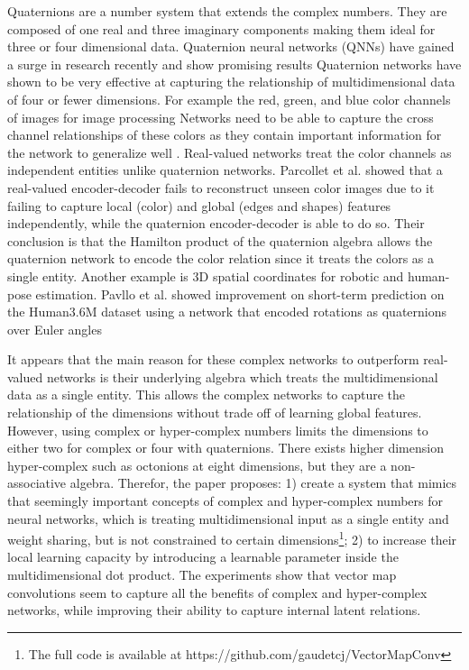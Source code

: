 \documentclass[14pt,a4paper]{article}
\begin{document}
Quaternions are a number system that extends the complex numbers.
They are composed of one real and three imaginary components making them ideal for three or four dimensional data.
Quaternion neural networks (QNNs) have gained a surge in research recently and show promising results \cite{takahashi2017remarks, bayro2018geometric, Gaudet2018, parcollet2017deep, parcollet2017quaternion, parcollet2018quaternion-A, parcollet2018quaternion-B, parcollet2019quaternion}
Quaternion networks have shown to be very effective at capturing the relationship of multidimensional data of four or fewer dimensions.
For example the red, green, and blue color channels of images for image processing
Networks need to be able to capture the cross channel relationships of these colors as they contain important information for the network to generalize well \cite{kusamichi2004new, isokawa2003quaternion}.
Real-valued networks treat the color channels as independent entities unlike quaternion networks.
Parcollet et al. \cite{parcollet2019quaternion} showed that a real-valued encoder-decoder fails to reconstruct unseen color images due to it failing to capture local (color) and global (edges and shapes) features independently, while the quaternion encoder-decoder is able to do so.
Their conclusion is that the Hamilton product of the quaternion algebra allows the quaternion network to encode the color relation since it treats the colors as a single entity.
Another example is 3D spatial coordinates for robotic and human-pose estimation.
Pavllo et al. \cite{pavllo2018quaternet} showed improvement on short-term prediction on the Human3.6M dataset using a network that encoded rotations as quaternions over Euler angles

It appears that the main reason for these complex networks to outperform real-valued networks is their underlying algebra which treats the multidimensional data as a single entity.
This allows the complex networks to capture the relationship of the dimensions without trade off of learning global features.
However, using complex or hyper-complex numbers limits the dimensions to either two for complex or four with quaternions.
There exists higher dimension hyper-complex such as octonions at eight dimensions, but they are a non-associative algebra.
Therefor, the paper proposes: 1) create a system that mimics that seemingly important concepts of complex and hyper-complex numbers for neural networks, which is treating multidimensional input as a single entity and weight sharing, but is not constrained to certain dimensions\footnote{The full code is available at https://github.com/gaudetcj/VectorMapConv}; 2) to increase their local learning capacity by introducing a learnable parameter inside the multidimensional dot product. The experiments show that vector map convolutions seem to capture all the benefits of complex and hyper-complex networks, while improving their ability to capture  internal latent relations.
\end{document}
